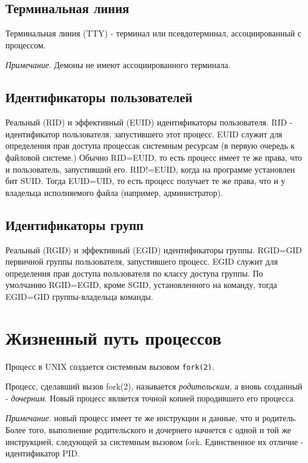 \subsection{Терминальная линия}
Терминальная линия (TTY) - терминал или псевдотерминал, ассоциированный с процессом. 

\emph{Примечание}. Демоны не имеют ассоциированного терминала. 

\subsection{Идентификаторы пользователей}
\label{euid} \label{rid}
Реальный (RID) и  эффективный (EUID) идентификаторы пользователя. RID - идентификатор пользователя, запустившего этот процесс. EUID служит для определения прав доступа процессак системным ресурсам (в первую очередь к файловой системе.)
Обычно RID=EUID, то есть процесс имеет те же права, что и пользователь, запустивший его. RID!=EUID, когда на программе установлен бит SUID. Тогда EUID=UID, то есть процесс получает те же права, что и у владельца исполняемого файла (например, администратор).

\subsection{Идентификаторы групп}

Реальный (RGID) и эффективный (EGID) идентификаторы группы. RGID=GID первичной группы пользователя, запустившего процесс. EGID служит для определения прав доступа пользователя по классу доступа группы. По умолчанию RGID=EGID, кроме SGID, установленного на команду, тогда EGID=GID группы-владельца команды.

\section{Жизненный путь процессов}

Процесс в UNIX создается системным вызовом \verb+fork(2)+. 

Процесс, сделавший вызов fork(2), называется \emph{родительским}, а вновь созданный - \emph{дочерним}. Новый процесс является точной копией породившего его процесса. 

\emph{Примечание}. новый процесс имеет те же инструкции и данные, что и родитель. Более того, выполнение родительского и дочернего начнется с одной и той же инструкцией, следующей за системным вызовом fork. Единственное их отличие - идентификатор PID.

